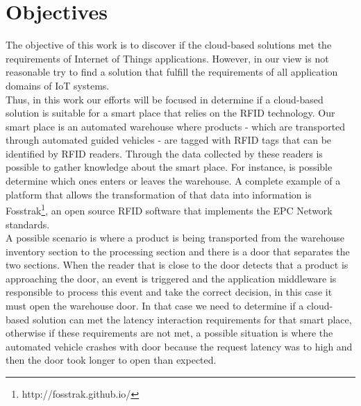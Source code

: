 \section{Objectives}
\label{section:objectives}
The objective of this work is to discover if the cloud-based solutions met the requirements of Internet of
Things applications. However, in our view is not reasonable try to find a solution that fulfill the
requirements of all application domains of \gls{IoT} systems.\\

Thus, in this work our efforts will be focused in determine if a cloud-based solution is suitable
for a smart place that relies on the \gls{RFID} technology. Our smart place is an automated warehouse
where products - which are transported through automated guided vehicles - are tagged with \gls{RFID}
tags that can be identified by \gls{RFID} readers. Through the data collected by these readers is
possible to gather knowledge about the smart place. For instance, is possible determine which ones
enters or leaves the warehouse. A complete example of a platform that allows the transformation of
that data into information is Fosstrak\footnote{http://fosstrak.github.io/}, an open source \gls{RFID}
software that implements the \gls{EPC} Network standards.\\

A possible scenario is where a product is being transported from the warehouse inventory section to
the processing section and there is a door that separates the two sections. When the reader that is
close to the door detects that a product is approaching the door, an event is triggered and the
application middleware is responsible to process this event and take the correct decision, in this
case it must open the warehouse door. In that case we need to determine if a cloud-based solution
can met the latency interaction requirements for that smart place, otherwise if these requirements are
not met, a possible situation is where the automated vehicle crashes with door because the request latency
was to high and then the door took longer to open than expected.\\

